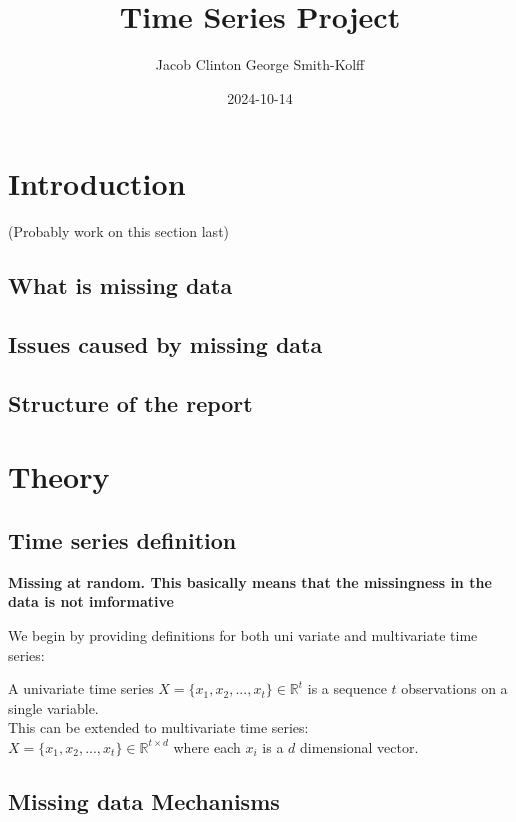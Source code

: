 \documentclass[
]{report}
\title{Time Series Project}
\author{Jacob Clinton George Smith-Kolff}
\date{2024-10-14}
\begin{document}
\maketitle

{
\setcounter{tocdepth}{1}
\tableofcontents
}
\chapter{Introduction}\label{introduction}

(Probably work on this section last)

\section{What is missing data}\label{what-is-missing-data}

\section{Issues caused by missing
data}\label{issues-caused-by-missing-data}

\section{Structure of the report}\label{structure-of-the-report}

\chapter{Theory}\label{theory}

\section{Time series definition}\label{time-series-definition}

\textbf{Missing at random. This basically means that the missingness in the data is not imformative}

We begin by providing definitions for both uni variate and multivariate
time series:

A univariate time series \(X = \{x_1, x_2, ..., x_t\} \in \mathbb{R}^t\)
is a sequence \(t\) observations on a single variable.\\
This can be extended to multivariate time series:\\
\(X = \{x_1, x_2, ..., x_t\}\in \mathbb{R}^{t\times d}\) where each
\(x_i\) is a \(d\) dimensional vector.

\section{Missing data Mechanisms}\label{missing-data-mechanisms}
\end{document}
